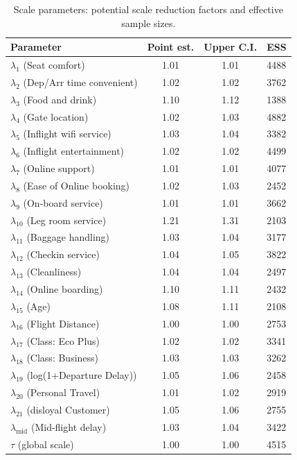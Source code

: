 \begin{table}[htbp]
\centering\small
\caption{Scale parameters: potential scale reduction factors and effective sample sizes.}
\label{tab:hs-psrf-lambda}
\begin{tabular}{l S[table-format=1.2] S[table-format=1.2] S[table-format=5.0]}
\toprule
Parameter & {Point est.} & {Upper C.I.} & {ESS} \\
\midrule
$\lambda_{1}$ (Seat comfort) & 1.01 & 1.01 & 4488 \\
$\lambda_{2}$ (Dep/Arr time convenient) & 1.02 & 1.02 & 3762 \\
$\lambda_{3}$ (Food and drink) & 1.10 & 1.12 & 1388 \\
$\lambda_{4}$ (Gate location) & 1.02 & 1.03 & 4882 \\
$\lambda_{5}$ (Inflight wifi service) & 1.03 & 1.04 & 3382 \\
$\lambda_{6}$ (Inflight entertainment) & 1.02 & 1.02 & 4499 \\
$\lambda_{7}$ (Online support) & 1.01 & 1.01 & 4077 \\
$\lambda_{8}$ (Ease of Online booking) & 1.02 & 1.03 & 2452 \\
$\lambda_{9}$ (On-board service) & 1.01 & 1.01 & 3662 \\
$\lambda_{10}$ (Leg room service) & 1.21 & 1.31 & 2103 \\
$\lambda_{11}$ (Baggage handling) & 1.03 & 1.04 & 3177 \\
$\lambda_{12}$ (Checkin service) & 1.04 & 1.05 & 3822 \\
$\lambda_{13}$ (Cleanliness) & 1.04 & 1.04 & 2497 \\
$\lambda_{14}$ (Online boarding) & 1.10 & 1.11 & 2432 \\
$\lambda_{15}$ (Age) & 1.08 & 1.11 & 2108 \\
$\lambda_{16}$ (Flight Distance) & 1.00 & 1.00 & 2753 \\
$\lambda_{17}$ (Class: Eco Plus) & 1.02 & 1.02 & 3341 \\
$\lambda_{18}$ (Class: Business) & 1.03 & 1.03 & 3262 \\
$\lambda_{19}$ (log(1+Departure Delay)) & 1.05 & 1.06 & 2458 \\
$\lambda_{20}$ (Personal Travel) & 1.01 & 1.02 & 2919 \\
$\lambda_{21}$ (disloyal Customer) & 1.05 & 1.06 & 2755 \\
$\lambda_{\text{mid}}$ (Mid-flight delay) & 1.03 & 1.04 & 3422 \\
$\tau$ (global scale) & 1.00 & 1.00 & 4515 \\
\bottomrule
\end{tabular}
\end{table}

